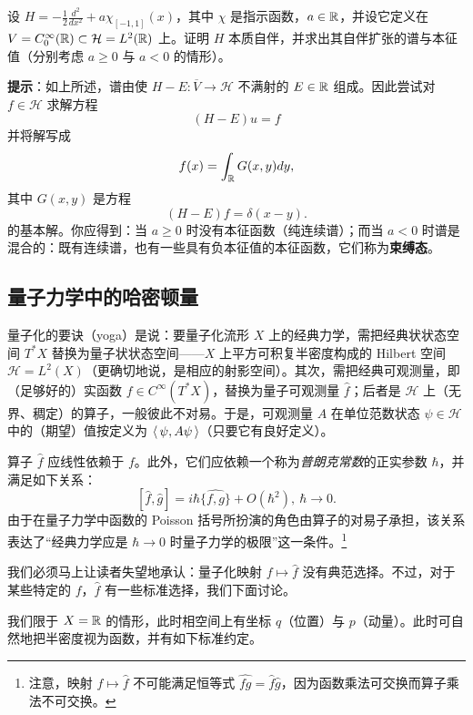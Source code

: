\begin{exercise} 设 $H=-\frac{1}{2}\frac{d^2}{dx^2}+a\chi_{[-1,1]}(x)$，其中 $\chi$ 是指示函数，$a\in \Bbb R$，并设它定义在 $V=C^\infty_0(\Bbb R)\subset \mathcal H=L^2(\Bbb R)$ 上。证明 $H$ 本质自伴，并求出其自伴扩张的谱与本征值（分别考虑 $a\ge 0$ 与 $a<0$ 的情形）。

\textbf{提示}：如上所述，谱由使 $H-E: \overline V\to \mathcal H$ 不满射的 $E\in \Bbb R$ 组成。因此尝试对 $f\in \mathcal H$ 求解方程
$$
(H-E)u=f
$$
并将解写成
$$
f(x)=\int_{\Bbb R} G(x,y)dy,
$$
其中 $G(x,y)$ 是方程
$$
(H-E)f=\delta(x-y).
$$
的基本解。你应得到：当 $a\ge 0$ 时没有本征函数（纯连续谱）；而当 $a<0$ 时谱是混合的：既有连续谱，也有一些具有负本征值的本征函数，它们称为\textbf{束缚态}。
\end{exercise}


\subsection{量子力学中的哈密顿量}

量子化的要诀（yoga）是说：要量子化流形 $X$ 上的经典力学，需把经典状状态空间 $T^*X$ 替换为量子状状态空间——$X$ 上平方可积复半密度构成的 Hilbert 空间 ${\mathcal H}=L^2(X)$（更确切地说，是相应的射影空间）。其次，需把经典可观测量，即（足够好的）实函数 $f\in C^\infty(T^*X)$，替换为量子可观测量 $\widehat f$；后者是 ${\mathcal H}$ 上（无界、稠定）的算子，一般彼此不对易。于是，可观测量 $A$ 在单位范数状态 $\psi\in \mathcal H$ 中的（期望）值按定义为 $\la\psi,A\psi\ra$（只要它有良好定义）。

算子 $\widehat f$ 应线性依赖于 $f$。此外，它们应依赖一个称为\emph{普朗克常数}的正实参数 $\hbar$，并满足如下关系：
$$
[\widehat{f},\widehat{g}]=i\hbar\widehat{\lbrace{f,g\rbrace}}+O(\hbar^2),\
\hbar\to 0.
$$
由于在量子力学中函数的 Poisson 括号所扮演的角色由算子的对易子承担，该关系表达了“经典力学应是 $\hbar\to 0$ 时量子力学的极限”这一条件。\footnote{注意，映射 $f\mapsto \widehat f$ 不可能满足恒等式 $\widehat{fg}=\widehat f\widehat g$，因为函数乘法可交换而算子乘法不可交换。}

我们必须马上让读者失望地承认：量子化映射 $f\mapsto \widehat f$ 没有典范选择。不过，对于某些特定的 $f$，$\widehat f$ 有一些标准选择，我们下面讨论。

我们限于 $X=\Bbb R$ 的情形，此时相空间上有坐标 $q$（位置）与 $p$（动量）。此时可自然地把半密度视为函数，并有如下标准约定。

